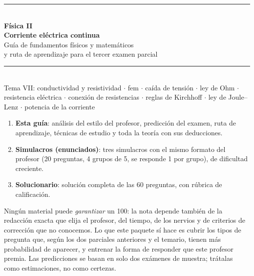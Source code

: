 \documentclass[11pt]{article}
\begin{document}
\begin{titlepage}
\centering
\vspace*{2cm}
{\color{azul}\rule{\linewidth}{1.5pt}}\\[0.6cm]
{\Huge\bfseries Física II\\[0.3cm] Corriente eléctrica continua}\\[0.4cm]
{\Large Guía de fundamentos físicos y matemáticos\\ y ruta de aprendizaje para el tercer examen parcial}\\[0.4cm]
{\color{azul}\rule{\linewidth}{1.5pt}}\\[1.2cm]
{\large Tema VII: conductividad y resistividad $\cdot$ fem $\cdot$ caída de tensión $\cdot$ ley de Ohm $\cdot$ resistencia eléctrica $\cdot$ conexión de resistencias $\cdot$ reglas de Kirchhoff $\cdot$ ley de Joule--Lenz $\cdot$ potencia de la corriente}\\[1.5cm]

\begin{tcolorbox}[base,colback=fondo,colframe=azul,width=0.9\linewidth,title=Contenido del paquete]
\begin{enumerate}[leftmargin=*]
\item \textbf{Esta guía}: análisis del estilo del profesor, predicción del examen, ruta de aprendizaje, técnicas de estudio y toda la teoría con sus deducciones.
\item \textbf{Simulacros (enunciados)}: tres simulacros con el mismo formato del profesor (20 preguntas, 4 grupos de 5, se responde 1 por grupo), de dificultad creciente.
\item \textbf{Solucionario}: solución completa de las 60 preguntas, con rúbrica de calificación.
\end{enumerate}
\end{tcolorbox}

\vfill
\begin{tcolorbox}[base,colback=red!3,colframe=rojo,width=0.9\linewidth,title=Nota de honestidad]
\small Ningún material puede \emph{garantizar} un 100: la nota depende también de la redacción exacta que elija el profesor, del tiempo, de los nervios y de criterios de corrección que no conocemos. Lo que este paquete sí hace es cubrir los tipos de pregunta que, según los dos parciales anteriores y el temario, tienen más probabilidad de aparecer, y entrenar la forma de responder que este profesor premia. Las predicciones se basan en solo dos exámenes de muestra; trátalas como estimaciones, no como certezas.
\end{tcolorbox}
\end{titlepage}
\end{document}
